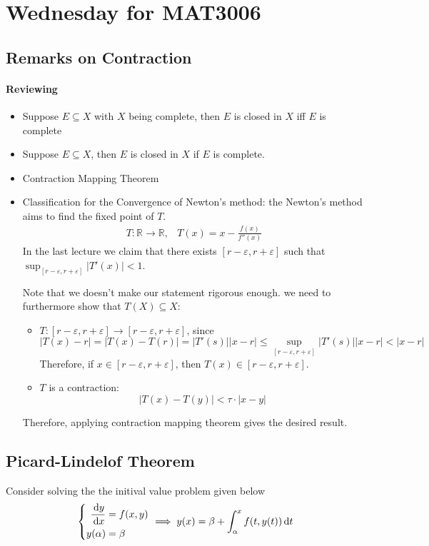 \section{Wednesday for MAT3006}
\subsection{Remarks on Contraction}
\paragraph{Reviewing}
\begin{itemize}
\item
Suppose $E\subseteq X$ with $X$ being complete, then
$E$ is closed in $X$ iff $E$ is complete
\item
Suppose $E\subseteq X$, then
$E$ is closed in $X$ if $E$ is complete.
\item
Contraction Mapping Theorem
\item
Classification for the Convergence of Newton's method: 
the Newton's method aims to find the fixed point of $T$.
\[
\begin{array}{ll}
T:\mathbb{R}\to\mathbb{R},
&
T(x)=x-\frac{f(x)}{f''(x)}
\end{array}
\]
In the last lecture we claim that there exists $[r-\varepsilon,r+\varepsilon]$ such that $\sup_{[r-\varepsilon,r+\varepsilon]}|T'(x)|<1$.

Note that we doesn't make our statement rigorous enough. we need to furthermore show that $T(X)\subseteq X$:
\begin{itemize}
\item
$T: [r-\varepsilon,r+\varepsilon]\to[r-\varepsilon,r+\varepsilon]$, since
\[
|T(x)-r|=|T(x)-T(r)|=|T'(s)||x-r|\le\sup_{[r-\varepsilon,r+\varepsilon]}|T'(s)||x-r|<|x-r|
\]
Therefore, if $x\in [r-\varepsilon,r+\varepsilon]$, then $T(x)\in [r-\varepsilon,r+\varepsilon]$.
\item
$T$ is a contraction:
\[
|T(x)-T(y)|<\tau\cdot|x-y|
\]
\end{itemize}
Therefore, applying contraction mapping theorem gives the desired result.
\end{itemize}

\subsection{Picard-Lindelof Theorem}

Consider solving the the initival value problem given below
\begin{equation}\label{Eq:3:11}
\left\{
\begin{aligned}
\frac{\diff y}{\diff x}&=f(x,y)\\
y(\alpha)&=\beta
\end{aligned}
\right.
\implies
y(x)=\beta+\int_{\alpha}^xf(t,y(t))\diff t
\end{equation}


